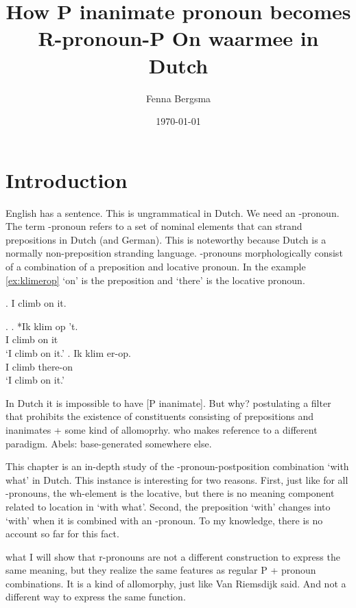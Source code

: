 \documentclass[12pt]{article}
\title{How P inanimate pronoun becomes R-pronoun-P On waarmee in Dutch}
\author{Fenna Bergsma}
\date{\today}
\begin{document}
\maketitle




\section{Introduction}

English has a sentence. This is ungrammatical in Dutch. We need an -pronoun. The term -pronoun \citep{riemsdijk1978} refers to a set of nominal elements that can strand prepositions in Dutch (and German). This is noteworthy because Dutch is a normally non-preposition stranding language. -pronouns morphologically consist of a combination of a preposition and locative pronoun. In the example \ref{ex:klimerop}  `on' is the preposition and  `there' is the locative pronoun.

\ex. I climb on it.

\ex.
\ag. *Ik klim op 't.\\
 I climb on it\\
 `I climb on it.'\label{ex:klimopt}
\bg. Ik klim er-op.\\
 I climb there-on\\
 `I climb on it.'\label{ex:klimerop}

In Dutch it is impossible to have [P inanimate]. But why? \citet{riemsdijk1978} postulating a filter that prohibits the existence of constituents consisting of prepositions and inanimates + some kind of allomoprhy. \citet{koopman2000} who makes reference to a different paradigm. Abels: base-generated somewhere else.

This chapter is an in-depth study of the -pronoun-postposition combination  `with what' in Dutch. This instance is interesting for two reasons. First, just like for all -pronouns, the wh-element is the locative, but there is no meaning component related to location in `with what'. Second, the preposition  `with' changes into  `with' when it is combined with an -pronoun. To my knowledge, there is no account so far for this fact.

what I will show that r-pronouns are not a different construction to express the same meaning, but they realize the same features as regular P + pronoun combinations. It is a kind of allomorphy, just like Van Riemsdijk said. And not a different way to express the same function.
\end{document}
